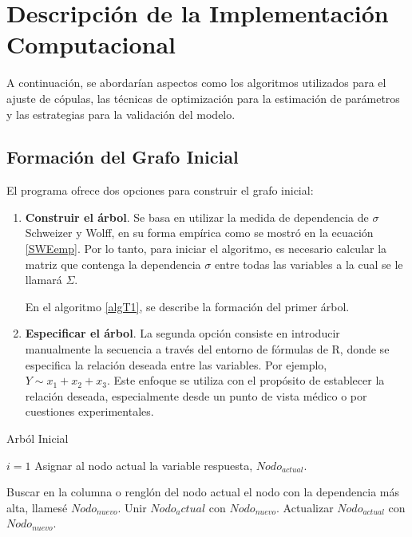 \section{Descripción de la Implementación Computacional}

A continuación, se abordarían aspectos como los algoritmos utilizados para el ajuste de cópulas, las técnicas de optimización para la estimación de parámetros y las estrategias para la validación del modelo. 

\subsection{Formación del Grafo Inicial}

El programa ofrece dos opciones para construir el grafo inicial:

\begin{enumerate}
    \item \textbf{Construir el árbol}. Se basa en utilizar la medida de dependencia de $\sigma$ Schweizer y Wolff, en su forma empírica como se mostró en la ecuación \eqref{SWEemp}. Por lo tanto, para iniciar el algoritmo, es necesario calcular la matriz que contenga la dependencia $\sigma$ entre todas las variables a la cual se le llamará $\Sigma$.

    En el algoritmo \ref{algT1}, se describe la formación del primer árbol.

    \item \textbf{Especificar el árbol}. La segunda opción consiste en introducir manualmente la secuencia a través del entorno de fórmulas de R, donde se especifica la relación deseada entre las variables. Por ejemplo, $Y \sim x_1 + x_2 + x_3$. Este enfoque se utiliza con el propósito de establecer la relación deseada, especialmente desde un punto de vista médico o  por cuestiones experimentales.
\end{enumerate}

\begin{algorithm}[H]
      \caption{Arból Inicial}
      \label{algT1}
      \begin{algorithmic}[1]  
        
        \State $i = 1$
        \State Asignar al nodo actual la variable respuesta, $Nodo_{actual}$.
        
          \State Buscar en la columna o renglón del nodo actual el nodo con la dependencia más alta, llamesé $Nodo_{nuevo}$.
          \State Unir $Nodo_actual$ con $Nodo_{nuevo}$.
          \State Actualizar $Nodo_{actual}$ con $Nodo_{nuevo}$.     
        \EndWhile
       
      \end{algorithmic}
    \end{algorithm}

